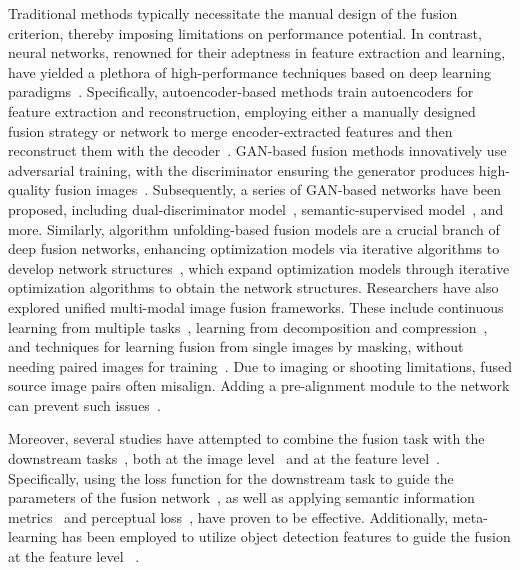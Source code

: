 Traditional methods typically necessitate the manual design of the fusion criterion, thereby imposing limitations on performance potential. 
In contrast, neural networks, renowned for their adeptness in feature extraction and learning, have yielded a plethora of high-performance techniques based on deep learning paradigms~\cite{DBLP:conf/aaai/Xu0LJG20,DBLP:journals/inffus/ZhangLSYZZ20}.
Specifically, autoencoder-based methods train autoencoders for feature extraction and reconstruction, employing either a manually designed fusion strategy or network to merge encoder-extracted features and then reconstruct them with the decoder~\cite{DBLP:journals/tip/LiW19,DBLP:journals/inffus/LiWK21,DBLP:journals/tim/LiWD20,DBLP:conf/ijcai/ZhaoXZLZL20,DBLP:journals/corr/abs-2211-14461}.
GAN-based fusion methods innovatively use adversarial training, with the discriminator ensuring the generator produces high-quality fusion images~\cite{DBLP:journals/inffus/MaYLLJ19,DBLP:journals/inffus/MaLYCGWJ20}. Subsequently, a series of GAN-based networks have been proposed, including dual-discriminator model~\cite{DBLP:journals/tip/MaXJMZ20}, semantic-supervised model~\cite{DBLP:journals/tmm/ZhouWZML23}, and more.
Similarly, algorithm unfolding-based fusion models are a crucial branch of deep fusion networks, enhancing optimization models via iterative algorithms to develop network structures~\cite{DBLP:journals/tcsv/ZhaoXZLZL22,DBLP:journals/pami/0002D21,DBLP:journals/corr/abs-2005-08448}, which expand optimization models through iterative optimization algorithms to obtain the network structures.
Researchers have also explored unified multi-modal image fusion frameworks. These include continuous learning from multiple tasks~\cite{DBLP:journals/pami/XuMJGL22}, learning from decomposition and compression~\cite{DBLP:journals/ijcv/ZhangM21}, and techniques for learning fusion from single images by masking, without needing paired images for training~\cite{DBLP:conf/eccv/LiangJLM22}.
Due to imaging or shooting limitations, fused source image pairs often misalign. Adding a pre-alignment module to the network can prevent such issues~\cite{DBLP:conf/eccv/HuangLFLZL22,DBLP:conf/ijcai/WangLFL22,DBLP:conf/cvpr/Xu0YLL22}.

Moreover, several studies have attempted to combine the fusion task with the downstream tasks~\cite{DBLP:conf/cvpr/LiuFHWLZL22}, both at the image level~\cite{DBLP:journals/inffus/TangYM22,DBLP:conf/cvpr/LiuFHWLZL22,DBLP:journals/tmm/ZhouWZML23} and at the feature level~\cite{zhao2023metafusion}. 
Specifically, using the loss function for the downstream task to guide the parameters of the fusion network~\cite{DBLP:journals/inffus/TangYM22}, as well as applying semantic information metrics~\cite{DBLP:journals/tmm/ZhouWZML23} and perceptual loss~\cite{DBLP:journals/inffus/LiWK21,DBLP:journals/tip/LiW19,DBLP:journals/inffus/ZhangLSYZZ20}, have proven to be effective.
Additionally, meta-learning has been employed to utilize object detection features to guide the fusion at the feature level ~\cite{zhao2023metafusion}.

